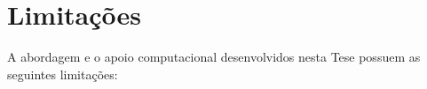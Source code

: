 
\section{Limitações}\label{sec:limitacoes_trabalho}

A abordagem e o apoio computacional desenvolvidos nesta Tese possuem as seguintes limitações:

